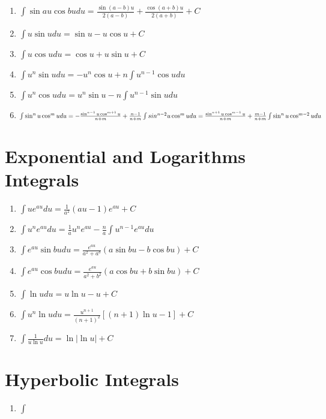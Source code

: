 \documentclass[12pt, letterpaper]{article}
\begin{document}
\begin{enumerate}
  \item $\int \limits \sin au \cos bu du = \frac{\sin(a-b)u}{2(a-b)} + \frac{\cos(a+b)u}{2(a+b)} +C$
  \item $\int \limits u \sin u du = \sin u - u \cos u +C$
  \item $\int \limits u \cos u du = \cos u + u \sin u +C$
  \item $\int \limits u ^n \sin u du = -u ^n \cos u + n \int \limits u ^{n-1} \cos u du$
  \item $\int \limits u ^n \cos u du = u ^n \sin u - n \int \limits u ^{n-1} \sin u du$
  \item $\int \limits \sin ^n u \cos ^m u du = -\frac{\sin ^{n-1} u \cos ^{m+1} u}{n+m} + \frac{n-1}{n+m} \int \limits sin^{n-2} u \cos ^m u du\\
  = \frac{\sin ^{n+1} u \cos ^{m-1} u}{n+m} + \frac{m-1}{n+m} \int \limits \sin ^n u \cos^{m-2} u du$
\end{enumerate}

\section{Exponential and Logarithms Integrals}
\begin{enumerate}
  \item $\int \limits u e ^{au} du = \frac{1}{a^2} (au-1) e^{au} +C$
  \item $\int \limits u ^n e ^{au} du = \frac{1}{a} u ^n e^{au} - \frac{n}{a} \int \limits u ^{n-1} e ^{au} du$
  \item $\int \limits e ^{au} \sin bu du = \frac{e^{au}}{a^2 + a^b} (a \sin bu - b \cos bu) +C$
  \item $\int \limits e^{au} \cos bu du = \frac{e^{au}}{a^2 + b^2} (a \cos bu + b \sin bu) +C$
  \item $\int \limits \ln u du = u \ln u - u + C$
  \item $\int \limits u ^n \ln u du = \frac{u^{n+1}}{(n+1)^2} [(n+1)\ln u-1] +C$
  \item $\int \limits \frac{1}{u \ln u} du = \ln | \ln u | +C$
\end{enumerate}

\section{Hyperbolic Integrals}
\begin{enumerate}
  \item $\int \limits$
\end{enumerate}
\end{document}
